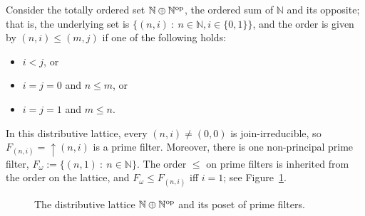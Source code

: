 \begin{example}\label{exa:NplusNop}
Consider the totally ordered set $\mathbb{N} \oplus \mathbb{N}^{\mathrm{op}}$, the ordered sum of $\mathbb{N}$ and its opposite; that is, the underlying set is $\{ (n, i) \ \colon \ n \in \mathbb{N}, i \in \{0,1\}\}$, and the order is given by $(n,i) \leq (m,j)$ if one of the following holds:
\begin{itemize}
  \item $i < j$, or
  \item $i = j = 0$ and $n \leq m$, or
  \item $i = j = 1$ and $m \leq n$.
\end{itemize}
In this distributive lattice, every $(n,i) \neq (0,0)$ is join-irreducible, so $F_{(n,i)} = {\uparrow}(n,i)$ is a prime filter. Moreover, there is one non-principal prime filter, $F_{\omega} := \{(n, 1) \ \colon \ n \in \mathbb{N}\}$. The order $\leq$ on prime filters is inherited from the order on the lattice, and $F_{\omega} \leq F_{(n,i)}$ iff $i = 1$; see Figure~\ref{fig:nplusnop}.

\begin{figure}[htp]
  \begin{center}
\end{center}
  \caption{The distributive lattice $\mathbb{N} \oplus \mathbb{N}^{\mathrm{op}}$ and its poset of prime filters.}
  \label{fig:nplusnop}
  \end{figure}
\end{example}


